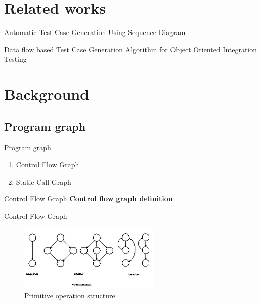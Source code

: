 \documentclass{beamer}
\begin{document}

%
\section{Related works}
\begin{frame}{Automatic Test Case Generation Using Sequence Diagram}
\end{frame}

\begin{frame}{Data flow based Test Case Generation Algorithm for Object Oriented Integration Testing}
\end{frame}

%
\section{Background}
\subsection{Program graph}
\begin{frame}{Program graph}
    \begin{enumerate}
        \item Control Flow Graph
        \item Static Call Graph
    \end{enumerate}
\end{frame}

\begin{frame}{Control Flow Graph}
    \textbf{Control flow graph definition}
    \parencite{Allen:1970:CFA:390013.808479}
\end{frame}

\begin{frame}{Control Flow Graph}
    \begin{figure}
        \includegraphics[width=0.7\paperwidth]{figure/Primitive-Operation-Structure}
        \caption{Primitive operation structure \parencite{McCabe1976}}
        \label{fig:primitivestructure}
    \end{figure}
\end{frame}
\end{document}
